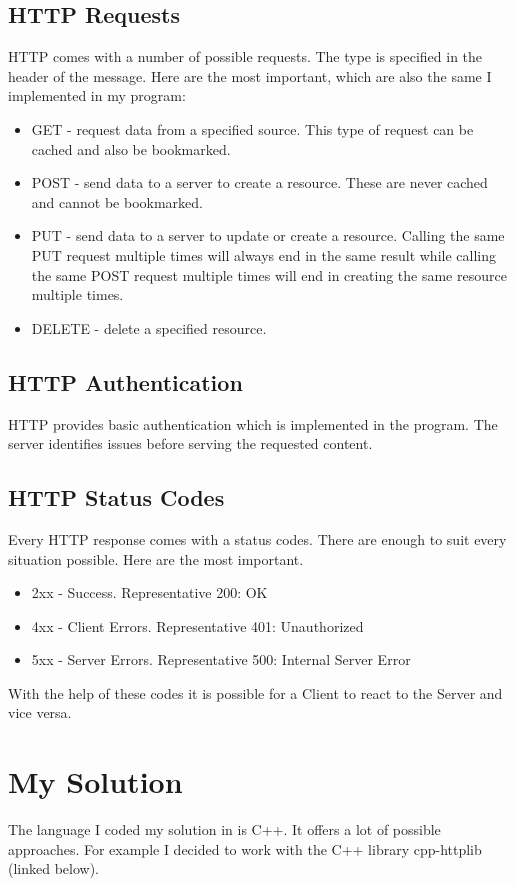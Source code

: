 \documentclass{article}
\begin{document}
\subsection{HTTP Requests}
HTTP comes with a number of possible requests. The type is specified in the header of the message. Here are the most important, which are also the same I implemented in my program: 

\begin{itemize}
    \item GET - request data from a specified source. This type of request can be cached and also be bookmarked.
    \item POST - send data to a server to create a resource. These are never cached and cannot be bookmarked.
    \item PUT - send data to a server to update or create a resource. Calling the same PUT request multiple times will always end in the same result while calling the same POST request multiple times will end in creating the same resource multiple times.
    \item DELETE - delete a specified resource.
\end{itemize}

\subsection{HTTP Authentication}
HTTP provides basic authentication which is implemented in the program. The server identifies issues before serving the requested content. 

\subsection{HTTP Status Codes}
Every HTTP response comes with a status codes. There are enough to suit every situation possible. Here are the most important. 

\begin{itemize}
    \item 2xx - Success. Representative 200: OK
    \item 4xx - Client Errors. Representative 401: Unauthorized
    \item 5xx - Server Errors. Representative 500: Internal Server Error
\end{itemize}

With the help of these codes it is possible for a Client to react to the Server and vice versa. 

\section{My Solution}
The language I coded my solution in is C++. It offers a lot of possible approaches. For example 
I decided to work with the C++ library cpp-httplib (linked below).
\end{document}
